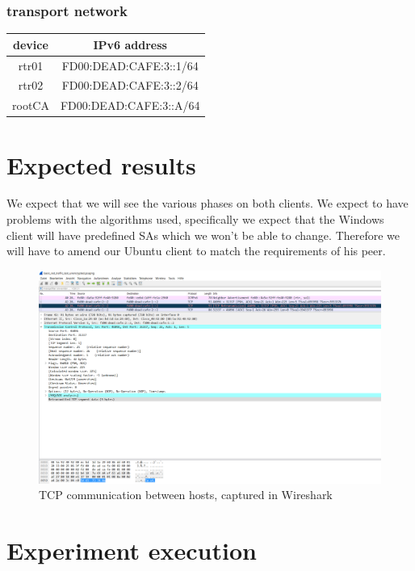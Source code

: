 \documentclass[a4paper]{report}
\begin{document}
\subsubsection{transport network}
\begin{tabular}{|c|c|}
	\hline 
	\textbf{device} & \textbf{IPv6 address} \\ 
	\hline 
	rtr01 & FD00:DEAD:CAFE:3::1/64 \\ 
	\hline 
	rtr02 & FD00:DEAD:CAFE:3::2/64 \\ 
	\hline 
	rootCA & FD00:DEAD:CAFE:3::A/64 \\ 
	\hline 
\end{tabular} 

\section{Expected results}
\label{sec:ExpectedResult}
We expect that we will see the various phases on both clients. We expect to have problems with the algorithms used, specifically we expect that the Windows client will have predefined SAs which we won't be able to change. Therefore we will have to amend our Ubuntu client to match the requirements of his peer.

\begin{figure}[htb]
	\includegraphics[width=\linewidth]{Testscript_unencrypted.png}
	\caption{TCP communication between hosts, captured in Wireshark}
	\label{fig:TestUnencrypted}
\end{figure}


\section{Experiment execution}
\label{sec:ExpExec}
\end{document}
